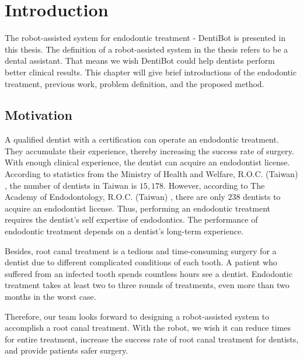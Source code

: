 \chapter{Introduction}
\hspace*{6mm}The robot-assisted system for endodontic treatment - DentiBot is presented in this thesis. The definition of a robot-assisted system in the thesis refers to be a dental assistant. That means we wish DentiBot could help dentists perform better clinical results. This chapter will give brief introductions of the endodontic treatment, previous work, problem definition, and the proposed method.
\section{Motivation}
\hspace*{6mm}A qualified dentist with a certification can operate an endodontic treatment. They accumulate their experience, thereby increasing the success rate of surgery. With enough clinical experience, the dentist can acquire an endodontist license. According to statistics from the Ministry of Health and Welfare, R.O.C. (Taiwan) \cite{web1}, the number of dentists in Taiwan is $15,178$. However, according to The Academy of Endodontology, R.O.C. (Taiwan) \cite{web2}, there are only $238$ dentists to acquire an endodontist license. Thus, performing an endodontic treatment requires the dentist's self expertise of endodontics. The performance of endodontic treatment depends on a dentist's long-term experience. 
\par
Besides, root canal treatment is a tedious and time-consuming surgery for a dentist due to different complicated conditions of each tooth. A patient who suffered from an infected tooth spends countless hours see a dentist. Endodontic treatment takes at least two to three rounds of treatments, even more than two months in the worst case.  
\par
Therefore, our team looks forward to designing a robot-assisted system to accomplish a root canal treatment.  With the robot, we wish it can reduce times for entire treatment, increase the success rate of root canal treatment for dentists, and provide patients safer surgery.

